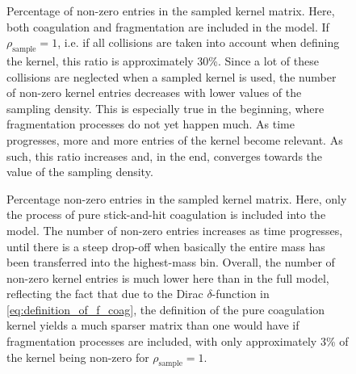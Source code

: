     
        \clearpage
        \begin{figure}[h!]
            \makebox[\textwidth]{\texttt{[image: 
                109/percentage non-zero kernel, coag=True, frag=True.pdf]}
            }
            \caption{
                Percentage of non-zero entries in the sampled kernel matrix.
                Here, both coagulation and fragmentation are included in the model. 
                If $\rho_\text{sample}=1$, i.e. if all collisions 
                are taken into account when defining the kernel, this ratio is 
                approximately 30\%. Since a lot of these collisions are neglected when 
                a sampled kernel is used, the number 
                of non-zero kernel entries decreases with lower values of the sampling 
                density. This is especially true in the beginning, where fragmentation 
                processes do not yet happen much. As time progresses, more and more 
                entries of the kernel become relevant. As such, this ratio increases and, 
                in the end, converges towards the value of the sampling density.
            }
            \label{fig:percentage_non_zero_only_coag}
        \end{figure}
        \vfill
        \begin{figure}[h!]
            \makebox[\textwidth]{\texttt{[image: 
                109/percentage non-zero kernel, coag=True, frag=False.pdf]}
            }
            \caption{
                Percentage non-zero entries in the sampled kernel matrix.
                Here, only the process of pure stick-and-hit coagulation 
                is included into the model. The number of non-zero entries 
                increases as time progresses, until there is a steep drop-off when basically 
                the entire mass has been transferred into the highest-mass 
                bin. Overall, the number of non-zero kernel entries is much lower 
                here than in the full model, reflecting the fact that 
                due to the Dirac $\delta$-function in \cref{eq:definition_of_f_coag}, 
                the definition of the
                pure coagulation kernel yields a much sparser matrix than one would have 
                if fragmentation processes are included, with only approximately 3\% of 
                the kernel being non-zero for $\rho_\text{sample}=1$.
            }
        \end{figure}

